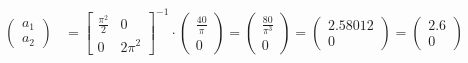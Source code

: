 \documentclass[
final,
a4paper,
oneside,
parskip=full,
headings=standardclasses,
headings=big,
pointednumbers,
fleqn
]{scrartcl}
\newcommand{\f}[2]{\frac{#1}{#2}}
\begin{document}
    {\setlength{\abovedisplayskip}{6pt}
    \setlength{\belowdisplayskip}{-12pt}
    \begin{align*}
        \begin{pmatrix}
            a_1 \\
            a_2
        \end{pmatrix} & =
        \begin{bmatrix}
            \f{\pi^2}{2} & 0 \\
            0             & 2\pi^2
        \end{bmatrix}^{-1} \cdot
        \begin{pmatrix}
            \f{40}{\pi} \\
            0
        \end{pmatrix} =
        \begin{pmatrix}
            \f{80}{\pi^3} \\
            0
        \end{pmatrix} =
        \begin{pmatrix}
            2.58012 \\
            0
        \end{pmatrix} =
        \begin{pmatrix}
            2.6 \\
            0
        \end{pmatrix}
    \end{align*}}
\end{document}
